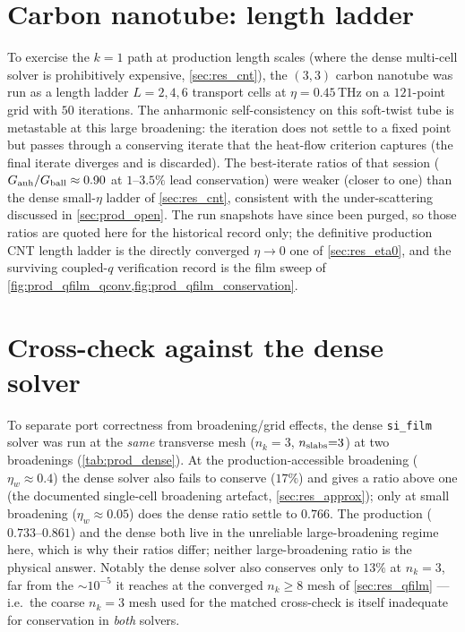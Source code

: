 \section{Carbon nanotube: length ladder}
\label{sec:prod_cnt}

To exercise the $k{=}1$ path at production length scales (where the dense
multi-cell solver is prohibitively expensive, \cref{sec:res_cnt}), the
$(3,3)$ carbon nanotube was run as a length ladder $L=2,4,6$ transport
cells at $\eta=0.45$\,THz on a $121$-point grid with $50$ iterations. The
anharmonic self-consistency on this soft-twist tube is metastable at this
large broadening: the iteration does not settle to a fixed point but
passes through a conserving iterate that the heat-flow criterion captures
(the final iterate diverges and is discarded). The best-iterate ratios of
that session ($G_{\rm anh}/G_{\rm ball}\approx0.90$ at $1$--$3.5\%$
lead conservation) were weaker (closer to one) than the dense
small-$\eta$ ladder of \cref{sec:res_cnt}, consistent with the
under-scattering discussed in \cref{sec:prod_open}. The run snapshots
have since been purged, so those ratios are quoted here for the
historical record only; the definitive production CNT length ladder is
the directly converged $\eta\to0$ one of \cref{sec:res_eta0}, and the
surviving coupled-$q$ verification record is the film sweep of
\cref{fig:prod_qfilm_qconv,fig:prod_qfilm_conservation}.

\section{Cross-check against the dense solver}
\label{sec:prod_dense}

To separate port correctness from broadening/grid effects, the dense
\texttt{si\_film} solver was run at the \emph{same} transverse mesh
($n_k{=}3$, $n_{\rm slabs}{=}3$) at two broadenings
(\cref{tab:prod_dense}). At the production-accessible broadening
($\eta_w\approx0.4$) the dense solver also fails to conserve
($17\%$) and gives a ratio above one (the documented single-cell
broadening artefact, \cref{sec:res_approx}); only at small broadening
($\eta_w\approx0.05$) does the dense ratio settle to $0.766$. The
production ($0.733$--$0.861$) and the dense both live in the unreliable
large-broadening regime here, which is why their ratios differ; neither
large-broadening ratio is the physical answer. Notably the dense solver
also conserves only to $13\%$ at $n_k{=}3$, far from the $\sim10^{-5}$ it
reaches at the converged $n_k{\geq}8$ mesh of \cref{sec:res_qfilm} ---
i.e.\ the coarse $n_k{=}3$ mesh used for the matched cross-check is itself
inadequate for conservation in \emph{both} solvers.

